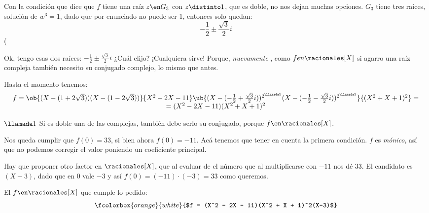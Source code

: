 \bigskip

Con la condición que dice que $f$ tiene una raíz $z \en G_3$ con $z \distinto 1$,
que es doble, no nos dejan muchas opciones. $G_3$ tiene tres raíces, solución
de $w^3 = 1$, dado que por enunciado no puede ser 1, entonces solo quedan:
$$
  -\frac{1}{2} \pm \frac{\sqrt{3}}{2}i
$$
(

\bigskip

Ok, tengo esas dos raíces: $-\frac{1}{2} \pm \frac{\sqrt{3}}{2}i$ ¿Cuál elijo? ¡Cualquiera
sirve! Porque, \textit{nuevamente {\tiny {}}}, como $f en \racionales[X]$ si agarro una raíz compleja
también necesito su conjugado complejo, lo mismo que antes.\par

Hasta el momento tenemos:
$$
  \begin{array}{c}
    f =
    \ob{(X - (1+2\sqrt{3})) (X - (1-2\sqrt{3}))}{X^2 - 2X - 11}
    \ub{(X - (-\frac{1}{2} + \frac{\sqrt{3}}{2}i))^{2^{\llamada1}}
    (X - (-\frac{1}{2} - \frac{\sqrt{3}}{2}i))^{2^{\llamada1}}}{(X^2 + X + 1)^2} = \\
    =(X^2 - 2X - 11)(X^2 + X + 1)^2
  \end{array}
$$

$\llamada1$ Si es doble una de las complejas, también debe serlo su conjugado, porque
$f\en \racionales[X]$.\bigskip

Nos queda cumplir que $f(0) = 33$, si bien ahora $f(0) = -11$. Acá tenemos que tener en cuenta
la primera condición. $f$ es \textit{mónico}, así que no podemos corregir el valor poniendo un coeficiente principal.

Hay que proponer otro factor en $\racionales[X]$, que al evaluar de el número que al multiplicarse con $-11$ nos dé
33. El candidato es $(X-3)$, dado que en 0 vale $-3$ y así $f(0) = (-11) \cdot (-3) = 33$ como queremos.\par

\bigskip

El $f \en\racionales[X]$ que cumple lo pedido:
$$
  \fcolorbox{orange}{white}{$f = (X^2 - 2X - 11)(X^2 + X + 1)^2(X-3)$}
$$

\begin{aportes}
  \item {}
\end{aportes}
